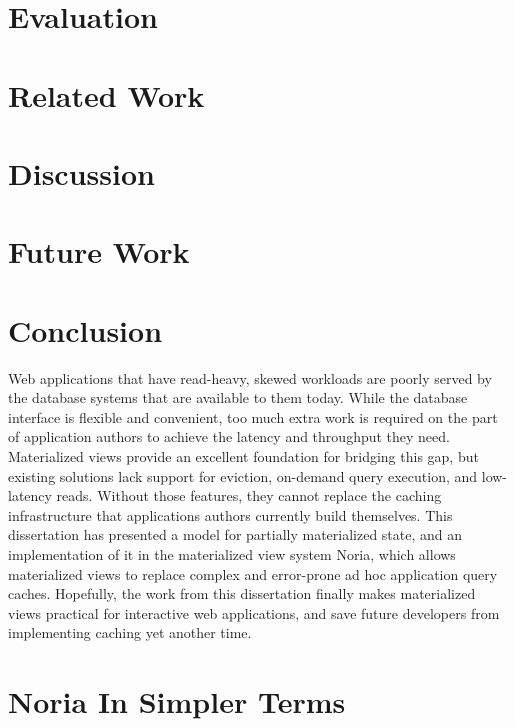 \documentclass[fontsize=12pt,paper=letter,draft=true]{scrbook}
\begin{document}


\chapter{Evaluation}
\label{s:eval}



\chapter{Related Work}
\label{s:related}



\chapter{Discussion}
\label{s:disc}



\chapter{Future Work}
\label{s:future}



\chapter{Conclusion}

Web applications that have read-heavy, skewed workloads are poorly served by
the database systems that are available to them today. While the database
interface is flexible and convenient, too much extra work is required on the
part of application authors to achieve the latency and throughput they need.
Materialized views provide an excellent foundation for bridging this gap, but
existing solutions lack support for eviction, on-demand query execution, and
low-latency reads. Without those features, they cannot replace the caching
infrastructure that applications authors currently build themselves. This
dissertation has presented a model for partially materialized state, and an
implementation of it in the materialized view system Noria, which allows
materialized views to replace complex and error-prone ad hoc application query
caches. Hopefully, the work from this dissertation finally makes materialized
views practical for interactive web applications, and save future developers
from implementing caching yet another time.

\appendix
\chapter{Noria In Simpler Terms}
\label{s:simple}



\backmatter

\begin{spacing}{1}
\printbibliography
\end{spacing}
\end{document}
